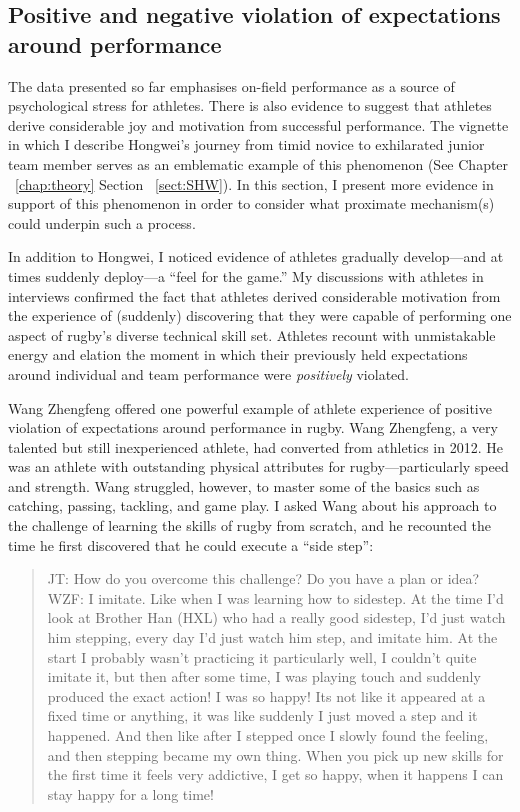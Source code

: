 \begin{CJK}{UTF8}{gbsn}
\subsection{Positive and negative violation of expectations around performance\label{sect:expectationViolation}}

The data presented so far emphasises on-field performance as a source of psychological stress for athletes. There is also evidence to suggest that athletes derive considerable joy and motivation from successful performance.  The vignette in which I describe Hongwei's journey from timid novice to exhilarated junior team member serves as an emblematic example of this phenomenon (See Chapter ~\ref{chap:theory} Section ~\ref{sect:SHW}).  In this section, I present more evidence in support of this phenomenon in order to consider what proximate mechanism(s) could underpin such a process.

In addition to Hongwei, I noticed evidence of athletes gradually develop---and at times suddenly deploy---a ``feel for the game.''  My discussions with athletes in interviews confirmed the fact that athletes derived considerable motivation from the experience of (suddenly) discovering that they were capable of performing one aspect of rugby's diverse technical skill set.  Athletes recount with unmistakable energy and elation the moment in which their previously held expectations around individual and team performance were \textit{positively} violated.

Wang Zhengfeng offered one powerful example of athlete experience of positive violation of expectations around performance in rugby.  Wang Zhengfeng, a very talented but still inexperienced athlete, had converted from athletics in 2012. He was an athlete with outstanding physical attributes for rugby---particularly speed and strength. Wang struggled, however, to master some of the basics such as catching,  passing, tackling, and game play.  I asked Wang about his approach to the challenge of learning the skills of rugby from scratch, and he recounted the time he first discovered that he could execute a ``side step'':

    \begin{quote}
      JT: How do you overcome this challenge? Do you have a plan or idea? \\
      WZF: I imitate.  Like when I was learning how to sidestep. At the time I’d look at Brother Han (HXL) who had a really good sidestep, I'd just watch him stepping, every day I'd just watch him step, and imitate him.  At the start I probably wasn't practicing it particularly well, I couldn't quite imitate it, but then after some time, I was playing touch and suddenly produced the exact action! I was so happy! Its not like it appeared at a fixed time or anything, it was like suddenly I just moved a step and it happened. And then like after I stepped once I slowly found the feeling, and then stepping became my own thing.  When you pick up new skills for the first time it feels very addictive, I get so happy, when it happens I can stay happy for a long time!
    \end{quote}


\end{CJK}

